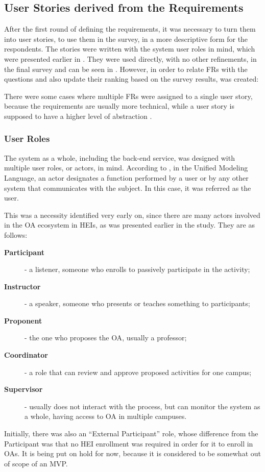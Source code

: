\subsection{User Stories derived from the Requirements}\label{ext:user-stories}

After the first round of defining the requirements, it was necessary to turn them into user stories, to use them in the survey, in a more descriptive form for the respondents. The stories were written with the system user roles in mind, which were presented earlier in . They were used directly, with no other refinements, in the final survey and can be seen in . However, in order to relate \acp{FR} with the questions and also update their ranking based on the survey results,  was created:



There were some cases where multiple \acp{FR} were assigned to a single user story, because the requirements are usually more technical, while a user story is supposed to have a higher level of abstraction \cite{DIMITRIJEVIC2015352}.

\subsubsection{User Roles}\label{ext:user-roles}

The system as a whole, including the back-end service, was designed with multiple user roles, or actors, in mind. According to , in the Unified Modeling Language, an actor designates a function performed by a user or by any other system that communicates with the subject. In this case, it was referred as the user.

This was a necessity identified very early on, since there are many actors involved in the \ac{OA} ecosystem in \acp{HEI}, as was presented earlier in the study. They are as follows:
\begin{description}
  \item[\textbf{Participant}] - a listener, someone who enrolls to passively participate in the activity;
  \item[\textbf{Instructor}] - a speaker, someone who presents or teaches something to participants;
  \item[\textbf{Proponent}] - the one who proposes the \ac{OA}, usually a professor;
  \item[\textbf{Coordinator}] - a role that can review and approve proposed activities for one campus;
  \item[\textbf{Supervisor}] - usually does not interact with the process, but can monitor the system as a whole, having access to \ac{OA} in multiple campuses.
\end{description}
Initially, there was also an ``External Participant'' role, whose difference from the Participant was that no \ac{HEI} enrollment was required in order for it to enroll in \acp{OA}. It is being put on hold for now, because it is considered to be somewhat out of scope of an \ac{MVP}.

